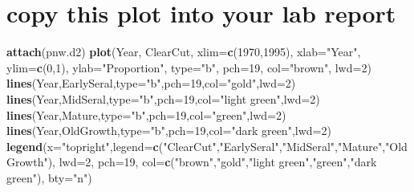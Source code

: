 \documentclass[
]{article}
\newenvironment{Shaded}{\begin{snugshade}}{\end{snugshade}}
\newcommand{\AttributeTok}[1]{\textcolor[rgb]{0.13,0.29,0.53}{#1}}
\newcommand{\DecValTok}[1]{\textcolor[rgb]{0.00,0.00,0.81}{#1}}
\newcommand{\FunctionTok}[1]{\textcolor[rgb]{0.13,0.29,0.53}{\textbf{#1}}}
\newcommand{\NormalTok}[1]{#1}
\newcommand{\StringTok}[1]{\textcolor[rgb]{0.31,0.60,0.02}{#1}}
\begin{document}
\section{copy this plot into your lab
report}\label{copy-this-plot-into-your-lab-report}

\begin{Shaded}
\begin{Highlighting}[]
\FunctionTok{attach}\NormalTok{(pnw.d2)}
\FunctionTok{plot}\NormalTok{(Year, ClearCut, }\AttributeTok{xlim=}\FunctionTok{c}\NormalTok{(}\DecValTok{1970}\NormalTok{,}\DecValTok{1995}\NormalTok{), }\AttributeTok{xlab=}\StringTok{"Year"}\NormalTok{, }\AttributeTok{ylim=}\FunctionTok{c}\NormalTok{(}\DecValTok{0}\NormalTok{,}\DecValTok{1}\NormalTok{), }\AttributeTok{ylab=}\StringTok{"Proportion"}\NormalTok{, }\AttributeTok{type=}\StringTok{"b"}\NormalTok{, }\AttributeTok{pch=}\DecValTok{19}\NormalTok{, }\AttributeTok{col=}\StringTok{"brown"}\NormalTok{, }\AttributeTok{lwd=}\DecValTok{2}\NormalTok{)}
\FunctionTok{lines}\NormalTok{(Year,EarlySeral,}\AttributeTok{type=}\StringTok{"b"}\NormalTok{,}\AttributeTok{pch=}\DecValTok{19}\NormalTok{,}\AttributeTok{col=}\StringTok{"gold"}\NormalTok{,}\AttributeTok{lwd=}\DecValTok{2}\NormalTok{)}
\FunctionTok{lines}\NormalTok{(Year,MidSeral,}\AttributeTok{type=}\StringTok{"b"}\NormalTok{,}\AttributeTok{pch=}\DecValTok{19}\NormalTok{,}\AttributeTok{col=}\StringTok{"light green"}\NormalTok{,}\AttributeTok{lwd=}\DecValTok{2}\NormalTok{)}
\FunctionTok{lines}\NormalTok{(Year,Mature,}\AttributeTok{type=}\StringTok{"b"}\NormalTok{,}\AttributeTok{pch=}\DecValTok{19}\NormalTok{,}\AttributeTok{col=}\StringTok{"green"}\NormalTok{,}\AttributeTok{lwd=}\DecValTok{2}\NormalTok{)}
\FunctionTok{lines}\NormalTok{(Year,OldGrowth,}\AttributeTok{type=}\StringTok{"b"}\NormalTok{,}\AttributeTok{pch=}\DecValTok{19}\NormalTok{,}\AttributeTok{col=}\StringTok{"dark green"}\NormalTok{,}\AttributeTok{lwd=}\DecValTok{2}\NormalTok{)}
\FunctionTok{legend}\NormalTok{(}\AttributeTok{x=}\StringTok{"topright"}\NormalTok{,}\AttributeTok{legend=}\FunctionTok{c}\NormalTok{(}\StringTok{"ClearCut"}\NormalTok{,}\StringTok{"EarlySeral"}\NormalTok{,}\StringTok{"MidSeral"}\NormalTok{,}\StringTok{"Mature"}\NormalTok{,}\StringTok{"OldGrowth"}\NormalTok{), }\AttributeTok{lwd=}\DecValTok{2}\NormalTok{, }\AttributeTok{pch=}\DecValTok{19}\NormalTok{, }\AttributeTok{col=}\FunctionTok{c}\NormalTok{(}\StringTok{"brown"}\NormalTok{,}\StringTok{"gold"}\NormalTok{,}\StringTok{"light green"}\NormalTok{,}\StringTok{"green"}\NormalTok{,}\StringTok{"dark green"}\NormalTok{), }\AttributeTok{bty=}\StringTok{"n"}\NormalTok{)}
\end{Highlighting}
\end{Shaded}
\end{document}

